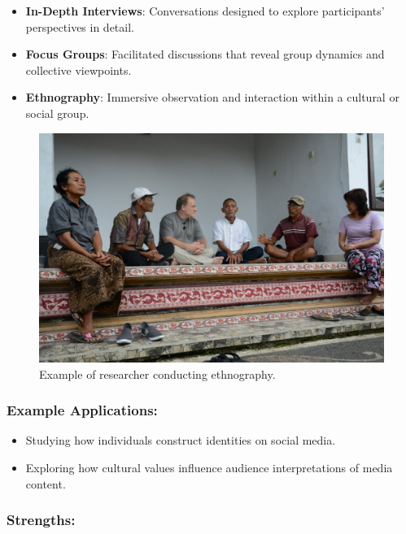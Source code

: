\documentclass[
]{book}
\providecommand{\tightlist}{%
  \setlength{\itemsep}{0pt}\setlength{\parskip}{0pt}}
\begin{document}
\begin{itemize}
\tightlist
\item
  \textbf{In-Depth Interviews}: Conversations designed to explore participants' perspectives in detail.
\item
  \textbf{Focus Groups}: Facilitated discussions that reveal group dynamics and collective viewpoints.
\item
  \textbf{Ethnography}: Immersive observation and interaction within a cultural or social group.
\end{itemize}

\begin{figure}
\centering
\includegraphics[width=1\linewidth,height=\textheight,keepaspectratio]{images/part-observation.jpg}
\caption{Example of researcher conducting ethnography.}
\end{figure}

\subsubsection*{Example Applications:}\label{example-applications}

\begin{itemize}
\tightlist
\item
  Studying how individuals construct identities on social media.
\item
  Exploring how cultural values influence audience interpretations of media content.
\end{itemize}

\subsubsection*{Strengths:}\label{strengths}
\end{document}
